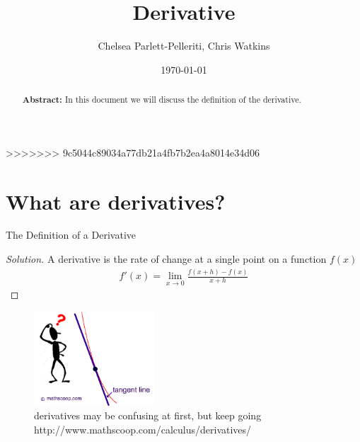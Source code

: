 \documentclass[aps,pra,notitlepage,amsmath,amssymb,letterpaper,12pt]{revtex4-1}
\newenvironment{problem}[2][Problem]{\begin{trivlist}
\item[\hskip \labelsep {\bfseries #1}\hskip \labelsep {\bfseries #2.}]}{\end{trivlist}}
\newenvironment{solution}{\begin{proof}[Solution]}{\end{proof}}
\begin{document}
\begin{abstract}
\textbf{Abstract:} In this document we will discuss the definition of the derivative.
\end{abstract}
>>>>>>> 9c5044c89034a77db21a4fb7b2ea4a8014e34d06
 
\title{Derivative}
\author{Chelsea Parlett-Pelleriti, Chris Watkins}
\date{\today}
\maketitle

\section{What are derivatives?} %

\begin{problem}{1} 
The Definition of a Derivative
\end{problem}
 
\begin{solution} %
A derivative is the rate of change at a single point on a function $f(x)$ 
\begin{align}
f'(x) = \lim_{x \rightarrow 0} \frac{f(x+h)-f(x)}{x+h}
\end{align}
\end{solution}



\begin{figure}[h!] %
  \includegraphics[width=0.4\textwidth]{1.png}  %
  \caption{derivatives may be confusing at first, but keep going  http://www.mathscoop.com/calculus/derivatives/}
  \label{fig:figlabel}
\end{figure}

 
 
\end{document}
